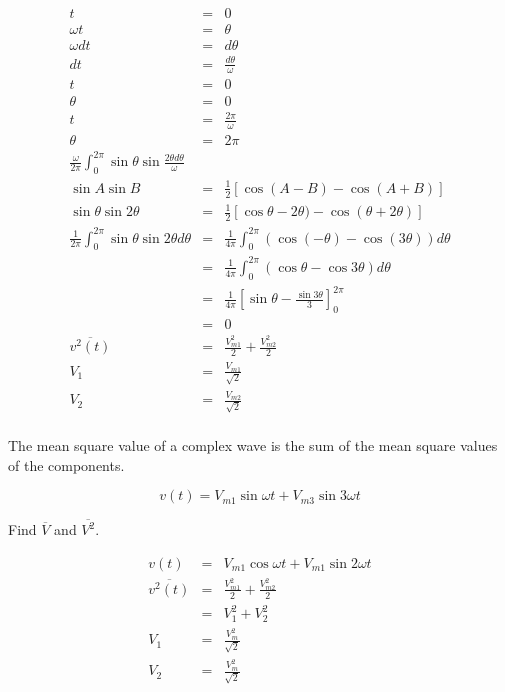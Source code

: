\documentclass[a4paper,12pt]{article}
\begin{document}
\begin{eqnarray*}
t					& = & 0 \\
\omega t			& = & \theta \\
\omega dt		& = & d \theta \\
dt					& = & \frac{d \theta}{\omega} \\
t					& = & 0 \\
\theta			& = & 0 \\
t					& = & \frac{2 \pi}{\omega} \\
\theta			& = & 2 \pi \\
\frac{\omega}{2 \pi} \int^{2 \pi}_{0} \sin{\theta}\sin{\frac{2\theta d
\theta}{\omega}} & & \\
\sin{A}\sin{B}	& = & \frac{1}{2} \left[\cos{(A-B)} - \cos{(A+B)} \right] \\
\sin{\theta}\sin{2 \theta} & = & \frac{1}{2} \left[ \cos{\theta - 2
\theta)} - \cos{(\theta + 2 \theta)} \right] \\
\frac{1}{2 \pi} \int^{2 \pi}_{0} \sin{\theta}\sin{2 \theta} d \theta & = & 
				\frac{1}{4\pi} \int^{2 \pi}_{0} (\cos{(-\theta)} - \cos{(3\theta)}) d \theta \\
		& = & \frac{1}{4\pi} \int^{2 \pi}_{0} (\cos{\theta} -	\cos{3\theta}) d \theta \\
		& = & \frac{1}{4\pi} \left[ \sin{\theta} - \frac{\sin{3\theta}}{3}
		\right]^{2 \pi}_{0} \\
		& = & 0 \\
\overline{v^{2}(t)} & = & \frac{V^{2}_{m1}}{2} + \frac{V^{2}_{m2}}{2} \\
V_{1} & = & \frac{V_{m1}}{\sqrt{2}} \\
V_{2} & = & \frac{V_{m2}}{\sqrt{2}} \\
\end{eqnarray*}

The mean square value of a complex wave is the sum  of the
mean square values of the components.

\[ v(t) = V_{m1} \sin{\omega t} + V_{m3} \sin{3 \omega t} \]

Find $\overline{V}$ and $\overline{V^{2}}$.


\begin{eqnarray*}
		v(t) & = & V_{m1} \cos{\omega t} + V_{m1} \sin{2\omega t} \\
\overline{v^{2}(t)}  & = & \frac{V_{m1}^{2}}{2} + \frac{V_{m2}^{2}}{2} \\
		     & = & V_{1}^{2} + V_{2}^{2} \\
V_{1}		     & = & \frac{V^{2}_{m}}{\sqrt{2}} \\
V_{2}                & = & \frac{V^{2}_{m}}{\sqrt{2}}
\end{eqnarray*}
\end{document}
